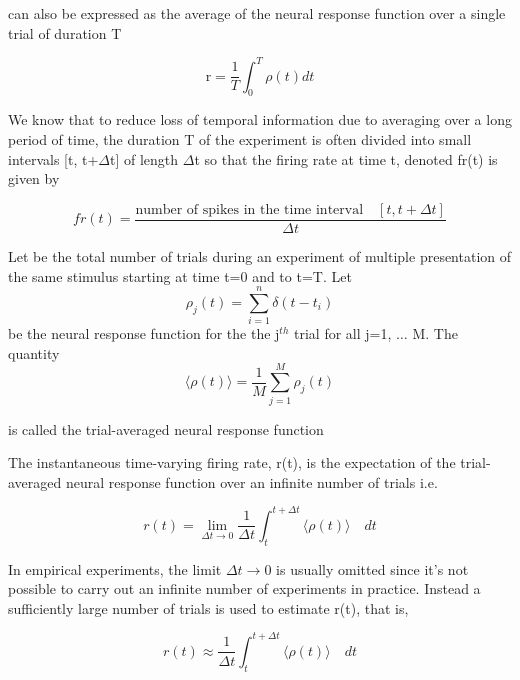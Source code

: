 can also be expressed as the average of the neural response function
over a single trial of duration T

\begin{equation}\label{spike-count rate}
  \text{r} =  \frac{1}{T}  \int_{0}^{T}  \rho(t)  dt
\end{equation}

We know that to reduce loss of temporal information due to averaging over a long period of time, the duration T of the experiment is often divided into small intervals [t, t+$\Delta$t] of length $\Delta$t so that the firing rate at time t,
denoted fr(t)  is  given by

\begin{equation}\label{single-trial emprical-spike count}
fr(t) = \dfrac{\text{number of spikes in the time interval} \quad [t, t+\Delta t]}
{\Delta t}
\end{equation}


\begin{Def}\label{trial-average neural response}
Let  be the total number of trials during an experiment
of multiple presentation of the same stimulus starting at time t=0 and to t=T. 
Let \[ \rho_{j}(t) = \displaystyle \sum_{i=1}^{n} \delta(t-t_{i})\] 
be the neural response function for the the j$^{th}$ trial for all j=1, $\dots$ M. The quantity 
\[ \langle \rho(t) \rangle  = 
\displaystyle  \frac{1}{M} \sum_{j=1}^{M} \rho_{j}(t)\] 

is called the trial-averaged neural response function

\end{Def}

The instantaneous time-varying firing rate, r(t), is the expectation of the 
trial-averaged neural response function over an infinite number of trials i.e.

\begin{equation} \label{expected FireRate}
r(t) = \displaystyle  \lim_{\Delta t \rightarrow 0}    \frac{1}{\Delta t}  \int_{t}^{t+\Delta t} 
 \langle \rho(t) \rangle \quad dt 
\end{equation}


In empirical experiments, the limit ${\Delta t \rightarrow 0}$ is usually
omitted since it's not possible to carry out an infinite number of experiments
in practice. Instead a sufficiently large number of trials is used
to estimate r(t), that is,

\[ 
r(t) \approx  \displaystyle  \frac{1}{\Delta t}  \int_{t}^{t+\Delta t} 
 \langle \rho(t) \rangle \quad dt 
\]


